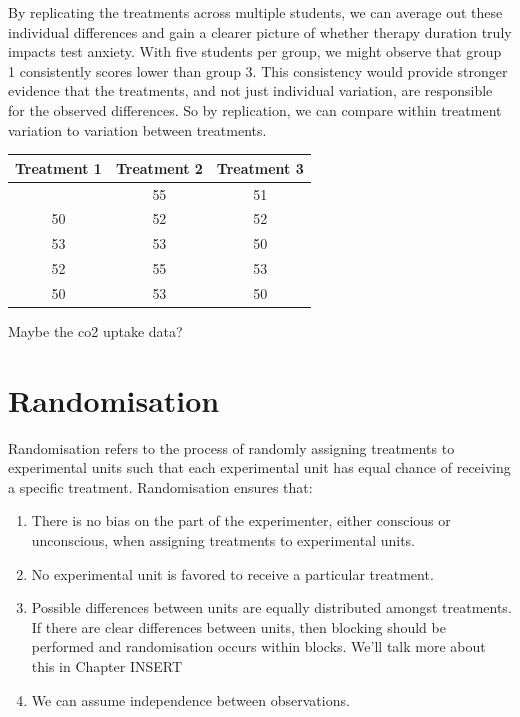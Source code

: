 \documentclass[
  letterpaper,
  DIV=11,
  numbers=noendperiod,
  oneside]{scrreprt}
\begin{document}
By replicating the treatments across multiple students, we can average
out these individual differences and gain a clearer picture of whether
therapy duration truly impacts test anxiety. With five students per
group, we might observe that group 1 consistently scores lower than
group 3. This consistency would provide stronger evidence that the
treatments, and not just individual variation, are responsible for the
observed differences. So by replication, we can compare within treatment
variation to variation between treatments.

\begin{longtable}[]{@{}ccc@{}}
\toprule\noalign{}
Treatment 1 & Treatment 2 & Treatment 3 \\
\midrule\noalign{}
\endhead
\bottomrule\noalign{}
\endlastfoot
48 & 55 & 51 \\
50 & 52 & 52 \\
53 & 53 & 50 \\
52 & 55 & 53 \\
50 & 53 & 50 \\
\end{longtable}

\begin{tcolorbox}[enhanced jigsaw, toprule=.15mm, colbacktitle=quarto-callout-tip-color!10!white, toptitle=1mm, left=2mm, colframe=quarto-callout-tip-color-frame, bottomrule=.15mm, titlerule=0mm, breakable, opacitybacktitle=0.6, colback=white, coltitle=black, opacityback=0, bottomtitle=1mm, title={Example 3.1}, rightrule=.15mm, arc=.35mm, leftrule=.75mm]

Maybe the co2 uptake data?

\end{tcolorbox}

\section{Randomisation}\label{randomisation}

Randomisation refers to the process of randomly assigning treatments to
experimental units such that each experimental unit has equal chance of
receiving a specific treatment. Randomisation ensures that:

\begin{enumerate}
\def\labelenumi{\arabic{enumi}.}
\item
  There is no bias on the part of the experimenter, either conscious or
  unconscious, when assigning treatments to experimental units.
\item
  No experimental unit is favored to receive a particular treatment.
\item
  Possible differences between units are equally distributed amongst
  treatments. If there are clear differences between units, then
  blocking should be performed and randomisation occurs within blocks.
  We'll talk more about this in Chapter INSERT
\item
  We can assume independence between observations.
\end{enumerate}
\end{document}
